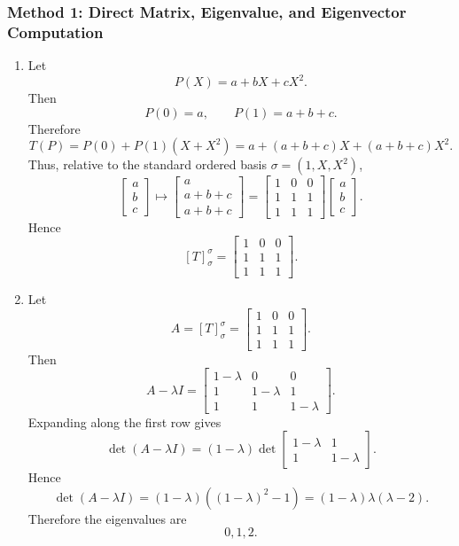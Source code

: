 \documentclass[12pt]{article}
\begin{document}
\subsubsection{Method 1: Direct Matrix, Eigenvalue, and Eigenvector Computation}
\begin{enumerate}[label=(\alph*)]
  \item Let
  \[
    P(X)=a+bX+cX^2.
  \]
  Then
  \[
    P(0)=a,
    \qquad
    P(1)=a+b+c.
  \]
  Therefore
  \[
    T(P)=P(0)+P(1)(X+X^2)
    =
    a+(a+b+c)X+(a+b+c)X^2.
  \]
  Thus, relative to the standard ordered basis $\sigma=(1,X,X^2)$,
  \[
    \begin{bmatrix}
      a\\b\\c
    \end{bmatrix}
    \mapsto
    \begin{bmatrix}
      a\\
      a+b+c\\
      a+b+c
    \end{bmatrix}
    =
    \begin{bmatrix}
      1&0&0\\
      1&1&1\\
      1&1&1
    \end{bmatrix}
    \begin{bmatrix}
      a\\b\\c
    \end{bmatrix}.
  \]
  Hence
  \[
    \boxed{[T]_{\sigma}^{\sigma}
    =
    \begin{bmatrix}
      1&0&0\\
      1&1&1\\
      1&1&1
    \end{bmatrix}.}
  \]

  \item Let
  \[
    A=[T]_{\sigma}^{\sigma}
    =
    \begin{bmatrix}
      1&0&0\\
      1&1&1\\
      1&1&1
    \end{bmatrix}.
  \]
  Then
  \[
    A-\lambda I
    =
    \begin{bmatrix}
      1-\lambda&0&0\\
      1&1-\lambda&1\\
      1&1&1-\lambda
    \end{bmatrix}.
  \]
  Expanding along the first row gives
  \[
    \det(A-\lambda I)
    =(1-\lambda)
    \det\begin{bmatrix}
      1-\lambda&1\\
      1&1-\lambda
    \end{bmatrix}.
  \]
  Hence
  \[
    \det(A-\lambda I)
    =(1-\lambda)((1-\lambda)^2-1)
    =(1-\lambda)\lambda(\lambda-2).
  \]
  Therefore the eigenvalues are
  \[
    \boxed{0,1,2.}
  \]


\end{enumerate}
\end{document}
